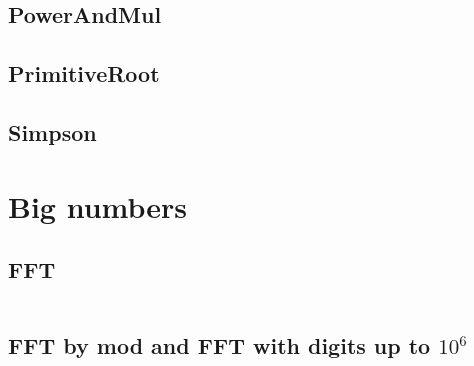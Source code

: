 \subsection{PowerAndMul}

\subsection{PrimitiveRoot}

\subsection{Simpson}




\section{Big numbers}

\subsection{FFT}
\inputminted[mathescape,tabsize=2]{cpp}{../BigNum/FFT.cpp}
\subsection{FFT by mod and FFT with digits up to $10^6$}
\inputminted[mathescape,tabsize=2]{cpp}{../BigNum/FFT_mod_ll.cpp}
